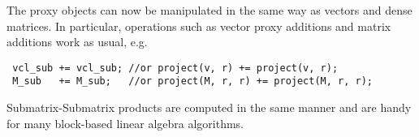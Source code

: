 The proxy objects can now be manipulated in the same way as vectors and dense matrices. In particular, operations such as vector proxy additions and matrix
additions work as usual, e.g.
\begin{lstlisting}
 vcl_sub += vcl_sub; //or project(v, r) += project(v, r);
 M_sub   += M_sub;   //or project(M, r, r) += project(M, r, r);
\end{lstlisting}
 Submatrix-Submatrix products are computed in the same manner and are handy for many block-based linear algebra algorithms.


